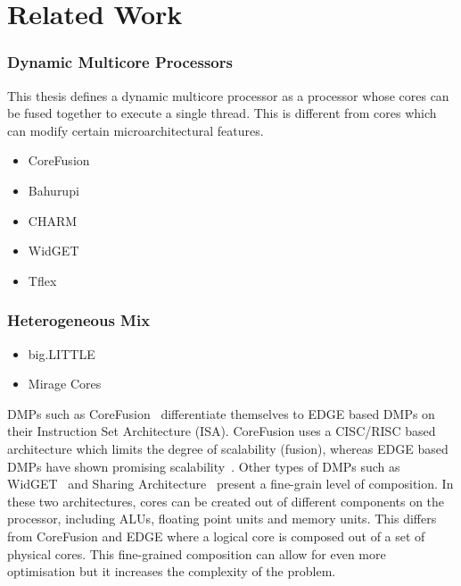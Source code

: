 \chapter{Related Work}

\subsection{Dynamic Multicore Processors}

This thesis defines a dynamic multicore processor as a processor whose cores can be fused together to execute a single thread.
This is different from cores which can modify certain microarchitectural features.
\begin{itemize}
\item CoreFusion~\cite{ipek2007CoreFusion}
\item Bahurupi~\cite{pricopi2012bahurupi,pricopiSchedCoreComp2014}
\item CHARM~\cite{cong2012charm}
\item WidGET~\cite{Watanabe2010Widget}
\item Tflex~\cite{kim2007tflex}
\end{itemize}


\subsection{Heterogeneous Mix}
\begin{itemize}
\item big.LITTLE~\cite{jeff2012big}
\item Mirage Cores~\cite{Padmanabha2017mirage}
\end{itemize}



DMPs such as CoreFusion~\cite{ipek2007CoreFusion} differentiate themselves to EDGE based DMPs on their Instruction Set Architecture (ISA).
CoreFusion uses a CISC/RISC based architecture which limits the degree of scalability (fusion), whereas EDGE based DMPs have shown promising scalability~\cite{kim2007tflex, sibi2014}.
Other types of DMPs such as WidGET~\cite{Watanabe2010Widget} and Sharing Architecture~\cite{zhou2014sharingarch} present a fine-grain level of composition.
In these two architectures, cores can be created out of different components on the processor, including ALUs, floating point units and memory units.
This differs from CoreFusion and EDGE where a logical core is composed out of a set of physical cores.
This fine-grained composition can allow for even more optimisation but it increases the complexity of the problem.

